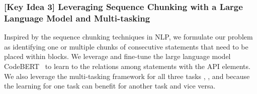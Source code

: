 

\subsubsection{{\bf [Key Idea 3] Leveraging Sequence Chunking with a Large Language Model and Multi-tasking}} 
Inspired by the sequence chunking techniques in NLP, we formulate our
problem as identifying one or multiple chunks of consecutive
statements that need to be placed within  blocks. We
leverage and fine-tune the large language model
CodeBERT~\cite{codebert-emnlp20} to learn to the relations among
statements with the API elements.  We also leverage the multi-tasking
framework for all three tasks {\xblock}, {\xstate}, and {\xtype}
because the learning for one task can benefit for another task and
vice versa.

